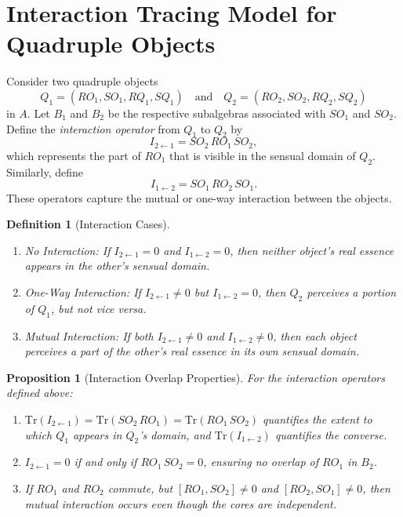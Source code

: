 \documentclass[12pt]{article}
\newtheorem{definition}{Definition}[section]
\newtheorem{proposition}{Proposition}[section]
\begin{document}
\section{Interaction Tracing Model for Quadruple Objects}

Consider two quadruple objects
\[
Q_1=(RO_1,SO_1,RQ_1,SQ_1) \quad \text{and} \quad Q_2=(RO_2,SO_2,RQ_2,SQ_2)
\]
in $A$. Let $B_1$ and $B_2$ be the respective subalgebras associated with $SO_1$ and $SO_2$. Define the \emph{interaction operator} from $Q_1$ to $Q_2$ by
\[
I_{2\leftarrow 1} = SO_2 \, RO_1 \, SO_2,
\]
which represents the part of $RO_1$ that is visible in the sensual domain of $Q_2$. Similarly, define
\[
I_{1\leftarrow 2} = SO_1 \, RO_2 \, SO_1.
\]
These operators capture the mutual or one-way interaction between the objects.

\begin{definition}[Interaction Cases]
\begin{enumerate}
    \item \emph{No Interaction:} If $I_{2\leftarrow 1} = 0$ \emph{and} $I_{1\leftarrow 2} = 0$, then neither object’s real essence appears in the other’s sensual domain.
    \item \emph{One-Way Interaction:} If $I_{2\leftarrow 1} \neq 0$ but $I_{1\leftarrow 2} = 0$, then $Q_2$ perceives a portion of $Q_1$, but not vice versa.
    \item \emph{Mutual Interaction:} If both $I_{2\leftarrow 1} \neq 0$ and $I_{1\leftarrow 2} \neq 0$, then each object perceives a part of the other’s real essence in its own sensual domain.
\end{enumerate}
\end{definition}

\begin{proposition}[Interaction Overlap Properties]
For the interaction operators defined above:
\begin{enumerate}
    \item $\mathrm{Tr}(I_{2\leftarrow 1}) = \mathrm{Tr}(SO_2 \, RO_1) = \mathrm{Tr}(RO_1 \, SO_2)$ quantifies the extent to which $Q_1$ appears in $Q_2$’s domain, and $\mathrm{Tr}(I_{1\leftarrow 2})$ quantifies the converse.
    \item $I_{2\leftarrow 1} = 0$ if and only if $RO_1 \, SO_2 = 0$, ensuring no overlap of $RO_1$ in $B_2$.
    \item If $RO_1$ and $RO_2$ commute, but $[RO_1,SO_2] \neq 0$ and $[RO_2,SO_1] \neq 0$, then mutual interaction occurs even though the cores are independent.
\end{enumerate}
\end{proposition}
\end{document}

